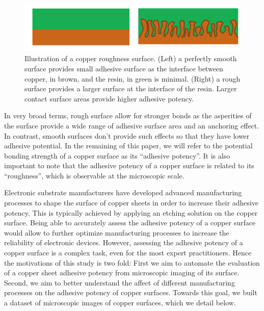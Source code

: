 \documentclass[10pt,twocolumn,letterpaper]{article}
\begin{document}
\begin{figure}[h]
\centering
\includegraphics[width=0.9\linewidth]{"./figures/Figure2"}
\caption{
Illustration of a copper roughness surface. 
(Left) a perfectly smooth surface provides small adhesive surface 
as the interface between copper, in brown, and the resin, in green is minimal. 
(Right) a rough surface provides a larger surface at the interface of the resin. 
Larger contact surface areas provide higher adhesive potency.
}
\end{figure}

In very broad terms, rough surface allow for stronger bonds 
as the asperities of the surface provide a wide range of adhesive surface area and an anchoring effect. 
In contrast, smooth surfaces don’t provide such effects so that they have lower adhesive potential. 
In the remaining of this paper, we will refer to the potential bonding strength of a copper surface as its ``adhesive potency''.
It is also important to note that the adhesive potency of a copper surface is related to its ``roughness'', 
which is observable at the microscopic scale.

Electronic substrate manufacturers have developed advanced manufacturing processes to shape the surface of copper sheets in order to increase their adhesive potency. 
This is typically achieved by applying an etching solution on the copper surface.
Being able to accurately assess the adhesive potency of a copper surface would 
allow to further optimize manufacturing processes to increase the reliability of electronic devices.
However, assessing the adhesive potency of a copper surface is a complex task, even for the most expert practitioners. 
Hence the motivations of this study is two fold: 
First we aim to automate the evaluation of a copper sheet adhesive potency from microscopic imaging of its surface. 
Second, we aim to better understand the affect of different manufacturing processes on the adhesive potency of copper surfaces.
Towards this goal, we built a dataset of microscopic images of copper surfaces, which we detail below.
\end{document}
